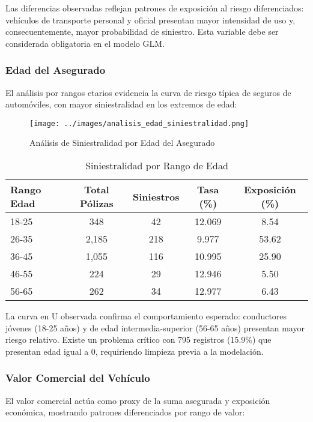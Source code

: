 Las diferencias observadas reflejan patrones de exposición al riesgo diferenciados: vehículos de transporte personal y oficial presentan mayor intensidad de uso y, consecuentemente, mayor probabilidad de siniestro. Esta variable debe ser considerada obligatoria en el modelo GLM.

\subsubsection{Edad del Asegurado}

El análisis por rangos etarios evidencia la curva de riesgo típica de seguros de automóviles, con mayor siniestralidad en los extremos de edad:

\begin{figure}[H]
\centering
\texttt{[image: ../images/analisis\_edad\_siniestralidad.png]}
\caption{Análisis de Siniestralidad por Edad del Asegurado}
\end{figure}

\begin{table}[H]
\centering
\caption{Siniestralidad por Rango de Edad}
\begin{tabular}{|l|c|c|c|c|}
\hline
\textbf{Rango Edad} & \textbf{Total Pólizas} & \textbf{Siniestros} & \textbf{Tasa (\%)} & \textbf{Exposición (\%)} \\
\hline
18-25 & 348 & 42 & 12.069 & 8.54 \\
26-35 & 2,185 & 218 & 9.977 & 53.62 \\
36-45 & 1,055 & 116 & 10.995 & 25.90 \\
46-55 & 224 & 29 & 12.946 & 5.50 \\
56-65 & 262 & 34 & 12.977 & 6.43 \\
\hline
\end{tabular}
\end{table}

La curva en U observada confirma el comportamiento esperado: conductores jóvenes (18-25 años) y de edad intermedia-superior (56-65 años) presentan mayor riesgo relativo. Existe un problema crítico con 795 registros (15.9\%) que presentan edad igual a 0, requiriendo limpieza previa a la modelación.

\subsubsection{Valor Comercial del Vehículo}

El valor comercial actúa como proxy de la suma asegurada y exposición económica, mostrando patrones diferenciados por rango de valor:

